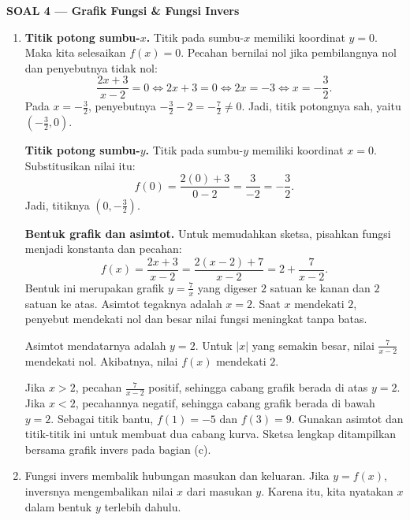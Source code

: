 \documentclass[11pt,a4paper]{article}
\newcommand{\judulsolusi}[2]{%
  \par\bigskip\textbf{SOAL #1 --- #2}\par\smallskip}
\begin{document}
\newpage
\judulsolusi{4}{Grafik Fungsi \& Fungsi Invers}
\begin{enumerate}
  \item \textbf{Titik potong sumbu-$x$.}
        Titik pada sumbu-$x$ memiliki koordinat $y=0$.
        Maka kita selesaikan $f(x)=0$.
        Pecahan bernilai nol jika pembilangnya nol dan penyebutnya tidak nol:
        \[
          \frac{2x+3}{x-2}=0\iff2x+3=0\iff2x=-3\iff x=-\frac32.
        \]
        Pada $x=-\frac32$, penyebutnya $-\frac32-2=-\frac72\ne0$.
        Jadi, titik potongnya sah, yaitu $\boxed{(-\frac32,0)}$.

        \textbf{Titik potong sumbu-$y$.}
        Titik pada sumbu-$y$ memiliki koordinat $x=0$.
        Substitusikan nilai itu:
        \[
          f(0)=\frac{2(0)+3}{0-2}=\frac{3}{-2}=-\frac32.
        \]
        Jadi, titiknya $\boxed{(0,-\frac32)}$.

        \textbf{Bentuk grafik dan asimtot.}
        Untuk memudahkan sketsa, pisahkan fungsi menjadi konstanta dan pecahan:
        \[
          f(x)=\frac{2x+3}{x-2}
          =\frac{2(x-2)+7}{x-2}=2+\frac7{x-2}.
        \]
        Bentuk ini merupakan grafik $y=\frac7x$ yang digeser $2$ satuan ke kanan
        dan $2$ satuan ke atas.
        Asimtot tegaknya adalah $x=2$.
        Saat $x$ mendekati $2$, penyebut mendekati nol dan besar nilai fungsi meningkat tanpa batas.

        Asimtot mendatarnya adalah $y=2$.
        Untuk $|x|$ yang semakin besar, nilai $\frac7{x-2}$ mendekati nol.
        Akibatnya, nilai $f(x)$ mendekati $2$.

        Jika $x>2$, pecahan $\frac7{x-2}$ positif, sehingga cabang grafik berada di atas $y=2$.
        Jika $x<2$, pecahannya negatif, sehingga cabang grafik berada di bawah $y=2$.
        Sebagai titik bantu, $f(1)=-5$ dan $f(3)=9$.
        Gunakan asimtot dan titik-titik ini untuk membuat dua cabang kurva.
        Sketsa lengkap ditampilkan bersama grafik invers pada bagian (c).

        \newpage
  \item Fungsi invers membalik hubungan masukan dan keluaran.
        Jika $y=f(x)$, inversnya mengembalikan nilai $x$ dari masukan $y$.
        Karena itu, kita nyatakan $x$ dalam bentuk $y$ terlebih dahulu.


\end{enumerate}
\end{document}
